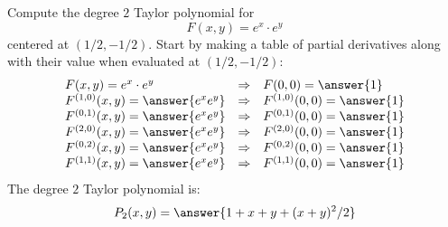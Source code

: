 \documentclass{ximera}
\author{Bart Snapp}
\begin{document}
\begin{exercise}
  Compute the degree $2$ Taylor polynomial for
  \[
  F(x,y) = e^x \cdot e^y
  \]
  centered at $(1/2,-1/2)$. Start by making a table of partial
  derivatives along with their value when evaluated at $(1/2,-1/2)$:
  \[
  \begin{array}{lcl}
    F(x,y) = e^x\cdot e^y & \Rightarrow &F(0,0) = \answer{1}\\
    F^{(1,0)}(x,y) = \answer{e^x e^y} & \Rightarrow & F^{(1,0)}(0,0) = \answer{1}\\
    F^{(0,1)}(x,y) = \answer{e^x e^y} &\Rightarrow  & F^{(0,1)}(0,0) = \answer{1}\\
    F^{(2,0)}(x,y) = \answer{e^x e^y} &\Rightarrow & F^{(2,0)}(0,0) = \answer{1}\\
    F^{(0,2)}(x,y) = \answer{e^x e^y} &\Rightarrow & F^{(0,2)}(0,0) = \answer{1}\\
    F^{(1,1)}(x,y) = \answer{e^x e^y} &\Rightarrow & F^{(1,1)}(0,0) = \answer{1}
    \end{array}
    \]
    The degree $2$ Taylor polynomial is:
    \[
    P_2(x,y) =\answer{1+x+y+(x+y)^2/2}
    \]
\end{exercise}
\end{document}
